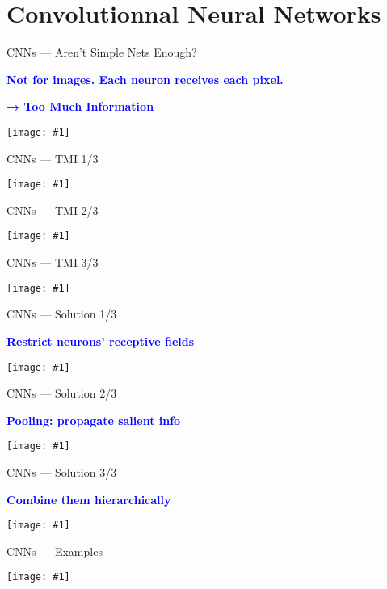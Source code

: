 \documentclass{beamer}
\newcommand\blue[1]{\textcolor{blue}{#1}}
\newcommand\cimg[1]{\vfill\centerline{\texttt{[image: \#1]}}\vfill}
\newcommand\cimgg[1]{\vfill\centerline{\texttt{[image: \#1]}}\vfill}
\newcommand\cimggg[1]{\vfill\centerline{\texttt{[image: \#1]}}\vfill}
\newcommand\vphrase[1]{\vfill\centerline{\large\bf\blue{#1}}\vfill}
\begin{document}
\section{Convolutionnal Neural Networks}
\label{sec:convnets}
\begin{frame}{CNNs --- Aren't Simple Nets Enough?}
  \vphrase{Not for images. Each neuron receives each pixel.}
  \vphrase{→ Too Much Information}
  \vfill
  \cimgg{tmi.jpg}
  \vfill
\end{frame}
\begin{frame}{CNNs --- TMI 1/3}
  \cimgg{park.jpg}
\end{frame}
\begin{frame}{CNNs --- TMI 2/3}
  \cimgg{station.jpg}
\end{frame}
\begin{frame}{CNNs --- TMI 3/3}
  \cimgg{street.jpg}
\end{frame}
\begin{frame}{CNNs --- Solution 1/3}
  \vphrase{Restrict neurons' receptive fields}
  \cimggg{kernel.jpg}
\end{frame}
\begin{frame}{CNNs --- Solution 2/3}
  \vphrase{Pooling: propagate salient info}
  \cimg{pooling.png}
\end{frame}
\begin{frame}{CNNs --- Solution 3/3}
  \vphrase{Combine them hierarchically}
  \cimg{cnn.jpg}
\end{frame}
\begin{frame}{CNNs --- Examples}
  \cimg{hierarchical-features.png}
\end{frame}
\end{document}
